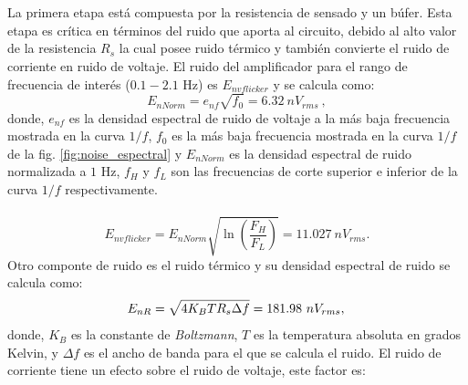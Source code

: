 \\ \\
La primera etapa está compuesta por la resistencia de sensado y un búfer. Esta etapa es crítica en términos del ruido que aporta al circuito, debido al alto valor de la resistencia $R_s$ la cual posee ruido térmico y también convierte el ruido de corriente en ruido de voltaje. El ruido del amplificador para el rango de frecuencia de interés ($0.1-2.1 $ Hz) es $E_{nvflicker}$ y se calcula como: 
\begin{equation}
    E_{nNorm}=e_{nf}\sqrt{f_0}= 6.32~nV_{rms} ~,
\end{equation}
donde, $e_{nf}$ es la densidad espectral de ruido de voltaje  a la más baja frecuencia mostrada en la curva $1/f$, $f_{0}$ es la más baja frecuencia mostrada en la curva $1/f$ de la fig. \ref{fig:noise_espectral} y $E_{nNorm}$ es la densidad espectral de ruido normalizada a $1$ Hz, $f_H$ y $f_L$ son las frecuencias de corte superior e inferior de la curva $1/f$ respectivamente.\\  \\
\begin{equation}
    E_{nvflicker}=E_{nNorm}\sqrt{\ln\left(\frac{F_H}{F_L}\right)}=11.027~nV_{rms}.
\end{equation}
Otro componte de ruido es el ruido térmico y su densidad espectral de ruido  se calcula como:
\begin{equation}
    E_{nR}=\sqrt{4K_BTR_s\Delta f}= 181.98~nV_{rms},\\
\end{equation}
donde, $K_B$ es la constante de \textit{Boltzmann}, $T$ es la temperatura absoluta en grados Kelvin, y $\Delta f$ es el ancho de banda para el que se calcula el ruido. El ruido de corriente tiene un efecto sobre el ruido de voltaje, este factor es:
